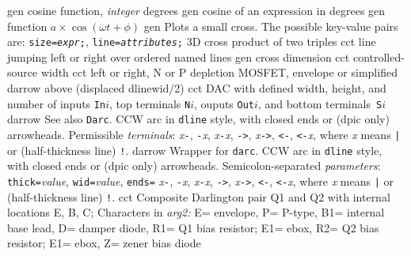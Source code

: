   {gen}
  {cosine function, {\sl integer\/} degrees}
  {gen}
  {cosine of an expression in degrees}
  {gen}
  {function $a\times\cos(\omega t + \phi)$ }
  {gen}
  {Plots a small cross.  The possible key-value pairs are:
    {\tt size={\sl expr};},
    {\tt line={\sl attributes};} }
  {3D}
  {cross product of two triples}
  {cct}
  {line jumping left or right over ordered named lines}
  {gen}
  {cross dimension}
  {cct}
  {controlled-source width}
%
  {cct}
  {left or right, N or P depletion MOSFET, envelope or simplified
    }
  {darrow}
  {above (displaced dlinewid/2)}
  {cct}
  {DAC with defined width, height, and number of inputs {\tt In$i$},
    top terminals {\tt N$i$}, ouputs {\tt Out$i$},
    and bottom terminals~{\tt S$i$} }
  {darrow}
  {See also {\tt Darc}.
   CCW arc in {\tt dline} style, with closed ends or (dpic only) arrowheads.
  Permissible {\sl terminals}:
  {\sl x}{\tt -},
  {\tt -}{\sl x}, {\sl x}{\tt -}{\sl x}, {\tt ->}, {\sl x}{\tt ->},
  {\tt <-}, {\tt <-}{\sl x}, {\tt <->}
  where {\sl x} means {\tt |} or (half-thickness line) {\tt !}.}
  {darrow}
  {Wrapper for {\tt darc}.
   CCW arc in {\tt dline} style, with closed ends or (dpic only) arrowheads.
  Semicolon-separated {\sl parameters}:
  {\tt thick=}{\sl value}, {\tt wid=}{\sl value}, {\tt ends=}
  {\sl x}{\tt -},
  {\tt -}{\sl x}, {\sl x}{\tt -}{\sl x}, {\tt ->}, {\sl x}{\tt ->},
  {\tt <-}, {\tt <-}{\sl x}, {\tt <->}
  where {\sl x} means {\tt |} or (half-thickness line) {\tt !}.}
  {cct}
  {Composite Darlington pair Q1 and Q2 with internal locations E, B, C;
   Characters in {\sl arg2:}
   E= envelope,
   P= P-type,
   B1= internal base lead,
   D= damper diode,
   R1= Q1 bias resistor; E1= ebox,
   R2= Q2 bias resistor; E1= ebox,
   Z= zener bias diode 
    }
